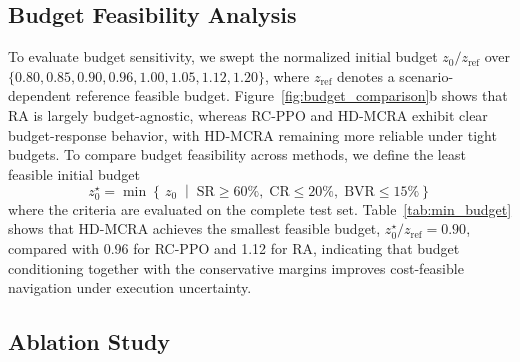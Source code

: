 \documentclass{article}
\begin{document}
\subsection{Budget Feasibility Analysis}

To evaluate budget sensitivity, we swept the normalized initial budget $z_0/z_{\mathrm{ref}}$ over $\{0.80, 0.85, 0.90, 0.96, 1.00, 1.05, 1.12, 1.20\}$, where $z_{\mathrm{ref}}$ denotes a scenario-dependent reference feasible budget. Figure~\ref{fig:budget_comparison}b shows that RA is largely budget-agnostic, whereas RC-PPO and HD-MCRA exhibit clear budget-response behavior, with HD-MCRA remaining more reliable under tight budgets. To compare budget feasibility across methods, we define the least feasible initial budget
\begin{equation}
z_0^{\star}=\min\left\{\,z_0 \;\middle|\; \mathrm{SR}\ge 60\%,\; \mathrm{CR}\le 20\%,\; \mathrm{BVR}\le 15\% \right\}
\label{eq:least_feasible_budget}
\end{equation}
where the criteria are evaluated on the complete test set. Table~\ref{tab:min_budget} shows that HD-MCRA achieves the smallest feasible budget, $z_0^{\star}/z_{\mathrm{ref}}=0.90$, compared with 0.96 for RC-PPO and 1.12 for RA, indicating that budget conditioning together with the conservative margins improves cost-feasible navigation under execution uncertainty.

\begin{table}[t]
\caption{Search result for the minimum feasible normalized initial budget.}
\label{tab:min_budget}
\centering
{}
\end{table}

\subsection{Ablation Study}
\end{document}
